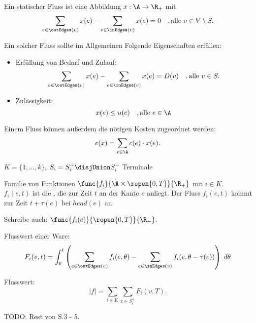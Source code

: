 \begin{definition}
    Ein statischer Fluss ist eine Abbildung $x : \A \rightarrow \R_+$ mit
    \[ \sum_{e \in \outEdges(v)} x(e) - \sum_{e \in \inEdges(v)} x(e) = 0 \quad, \text{alle } v \in V \setminus S. \]

    Ein solcher Fluss sollte im Allgemeinen Folgende Eigenschaften erfüllen:
    \begin{itemize}
        \item Erfüllung von Bedarf und Zulauf:
            \[ \sum_{e \in \outEdges(v)} x(e) - \sum_{e \in \inEdges(v)} x(e) = D(v) \quad, \text{alle } v \in S. \]
        \item Zulässigkeit:
            \[ x(e) \leq u(e) \quad, \text{alle } e \in \A \]
    \end{itemize}

    Einem Fluss können außerdem die nötigen Kosten zugeordnet werden:
        \[ c(x) = \sum_{e \in \A} c(e) \cdot x(e). \]
\end{definition}

\begin{definition}
    $K = \{1, \ldots, k\}$, $S_i = S_i^+ \disjUnion S_i^-$ Terminale
\end{definition}

\begin{definition}
    Familie von Funktionen $\func{f_i}{\A \times \ropen{0,T}}{\R_+}$ mit $i \in K$.
    $f_i(e,t)$ ist die , die zur Zeit $t$ an der Kante $e$ anliegt.
    Der Fluss $f_i(e,t)$ kommt zur Zeit $t + \tau(e)$ bei $head(e)$ an.

    Schreibe auch: $\func{f_i(e)}{\ropen{0,T}}{\R_+}$.

    Flusswert einer Ware:
    \[
        F_i(v, t) =
            \int_0^t \left(
                \sum_{e \in \outEdges(v)} f_i(e, \theta) -
                \sum_{e \in \inEdges(v)} f_i(e, \theta - \tau(e)) \right) \;d\theta
    \]

    Flusswert:
    \[
        |f| = \sum_{i \in K} \sum_{v \in S_i^+} F_i(v,T).
    \]

    TODO: Rest von S.3 - 5.
\end{definition}
